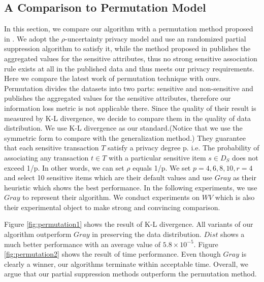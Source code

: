 \subsection{A Comparison to Permutation Model}
In this section, we compare our algorithm with a permutation method proposed
in \cite{2011:TKDE:Anonymous}. We adopt the $\rho$-uncertainty privacy model
\cite{Cao:2010:rho} and use an randomized partial suppression algorithm to
satisfy it, while the method proposed in \cite{2011:TKDE:Anonymous} publishes
the aggregated values for the sensitive attributes,
thus no strong sensitive association rule exists at all
in the published data and thus meets our privacy requirements. 
Here we compare the latest work of permutation technique
\cite{2011:TKDE:Anonymous} with ours. Permutation divides the
datasets into two parts: sensitive and non-sensitive and publishes the
aggregated values for the sensitive attributes, therefore our information
loss metric is not applicable there. Since the quality of their result is
measured by K-L divergence\cite{Lin91divergencemeasures}, we decide to
compare them in the quality of data distribution. We use K-L divergence as our
standard.(Notice that we use the symmetric form to compare with the
generalization method.) They guarantee that each sensitive transaction $T$
satisfy a privacy degree p. i.e. The probability of associating any
transaction $t\in T$ with a particular sensitive item $s\in D_S$ does not
exceed 1/p. In other words, we can set $\rho$ equals 1/p. We set $p=4, 6, 8,
10, r=4$ and select 10 sensitive items which are  their default values and
use $Gray$ as their heuristic which shows the best performance. In the
following experiments, we use $Gray$ to represent their algorithm.
 We conduct experiments on $WV$ which is also their experimental 
object to make strong and convincing comparison.

Figure \ref{fig:permutation1} shows the result of K-L divergence. 
All variants of our algorithm outperform $Gray$ in 
preserving the data distribution. $Dist$ shows
a much better performance with an average value of $5.8 \times 10 ^{-5}$. 
Figure \ref{fig:permutation2} shows the result of time performance. 
Even though $Gray$ is clearly a winner, our algorithms
terminate within acceptable time. 
Overall, we argue that our partial suppression methods
outperform the permutation method.


